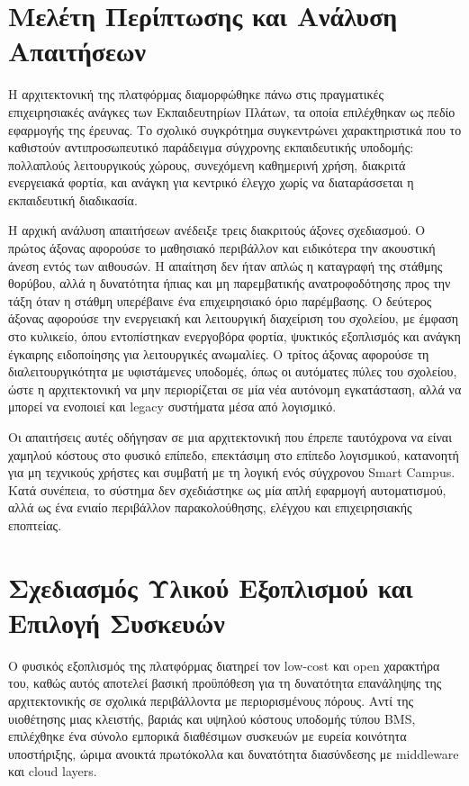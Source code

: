 \section{Μελέτη Περίπτωσης και Ανάλυση Απαιτήσεων}
Η αρχιτεκτονική της πλατφόρμας διαμορφώθηκε πάνω στις πραγματικές επιχειρησιακές ανάγκες των Εκπαιδευτηρίων Πλάτων, τα οποία επιλέχθηκαν ως πεδίο εφαρμογής της έρευνας. Το σχολικό συγκρότημα συγκεντρώνει χαρακτηριστικά που το καθιστούν αντιπροσωπευτικό παράδειγμα σύγχρονης εκπαιδευτικής υποδομής: πολλαπλούς λειτουργικούς χώρους, συνεχόμενη καθημερινή χρήση, διακριτά ενεργειακά φορτία, και ανάγκη για κεντρικό έλεγχο χωρίς να διαταράσσεται η εκπαιδευτική διαδικασία.

Η αρχική ανάλυση απαιτήσεων ανέδειξε τρεις διακριτούς άξονες σχεδιασμού. Ο πρώτος άξονας αφορούσε το μαθησιακό περιβάλλον και ειδικότερα την ακουστική άνεση εντός των αιθουσών. Η απαίτηση δεν ήταν απλώς η καταγραφή της στάθμης θορύβου, αλλά η δυνατότητα ήπιας και μη παρεμβατικής ανατροφοδότησης προς την τάξη όταν η στάθμη υπερέβαινε ένα επιχειρησιακό όριο παρέμβασης. Ο δεύτερος άξονας αφορούσε την ενεργειακή και λειτουργική διαχείριση του σχολείου, με έμφαση στο κυλικείο, όπου εντοπίστηκαν ενεργοβόρα φορτία, ψυκτικός εξοπλισμός και ανάγκη έγκαιρης ειδοποίησης για λειτουργικές ανωμαλίες. Ο τρίτος άξονας αφορούσε τη διαλειτουργικότητα με υφιστάμενες υποδομές, όπως οι αυτόματες πύλες του σχολείου, ώστε η αρχιτεκτονική να μην περιορίζεται σε μία νέα αυτόνομη εγκατάσταση, αλλά να μπορεί να ενοποιεί και \textlatin{legacy} συστήματα μέσα από λογισμικό.

Οι απαιτήσεις αυτές οδήγησαν σε μια αρχιτεκτονική που έπρεπε ταυτόχρονα να είναι χαμηλού κόστους στο φυσικό επίπεδο, επεκτάσιμη στο επίπεδο λογισμικού, κατανοητή για μη τεχνικούς χρήστες και συμβατή με τη λογική ενός σύγχρονου \textlatin{Smart Campus}. Κατά συνέπεια, το σύστημα δεν σχεδιάστηκε ως μία απλή εφαρμογή αυτοματισμού, αλλά ως ένα ενιαίο περιβάλλον παρακολούθησης, ελέγχου και επιχειρησιακής εποπτείας.

\section{Σχεδιασμός Υλικού Εξοπλισμού και Επιλογή Συσκευών}
Ο φυσικός εξοπλισμός της πλατφόρμας διατηρεί τον \textlatin{low-cost} και \textlatin{open} χαρακτήρα του, καθώς αυτός αποτελεί βασική προϋπόθεση για τη δυνατότητα επανάληψης της αρχιτεκτονικής σε σχολικά περιβάλλοντα με περιορισμένους πόρους. Αντί της υιοθέτησης μιας κλειστής, βαριάς και υψηλού κόστους υποδομής τύπου \textlatin{BMS}, επιλέχθηκε ένα σύνολο εμπορικά διαθέσιμων συσκευών με ευρεία κοινότητα υποστήριξης, ώριμα ανοικτά πρωτόκολλα και δυνατότητα διασύνδεσης με \textlatin{middleware} και \textlatin{cloud layers}.

